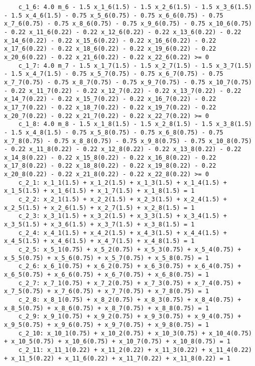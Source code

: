 \documentclass{article}[A4]
\begin{document}
\begin{lstlisting}
	c_1_6: 4.0 m_6 - 1.5 x_1_6(1.5) - 1.5 x_2_6(1.5) - 1.5 x_3_6(1.5) - 1.5 x_4_6(1.5) - 0.75 x_5_6(0.75) - 0.75 x_6_6(0.75) - 0.75 x_7_6(0.75) - 0.75 x_8_6(0.75) - 0.75 x_9_6(0.75) - 0.75 x_10_6(0.75) - 0.22 x_11_6(0.22) - 0.22 x_12_6(0.22) - 0.22 x_13_6(0.22) - 0.22 x_14_6(0.22) - 0.22 x_15_6(0.22) - 0.22 x_16_6(0.22) - 0.22 x_17_6(0.22) - 0.22 x_18_6(0.22) - 0.22 x_19_6(0.22) - 0.22 x_20_6(0.22) - 0.22 x_21_6(0.22) - 0.22 x_22_6(0.22) >= 0
	c_1_7: 4.0 m_7 - 1.5 x_1_7(1.5) - 1.5 x_2_7(1.5) - 1.5 x_3_7(1.5) - 1.5 x_4_7(1.5) - 0.75 x_5_7(0.75) - 0.75 x_6_7(0.75) - 0.75 x_7_7(0.75) - 0.75 x_8_7(0.75) - 0.75 x_9_7(0.75) - 0.75 x_10_7(0.75) - 0.22 x_11_7(0.22) - 0.22 x_12_7(0.22) - 0.22 x_13_7(0.22) - 0.22 x_14_7(0.22) - 0.22 x_15_7(0.22) - 0.22 x_16_7(0.22) - 0.22 x_17_7(0.22) - 0.22 x_18_7(0.22) - 0.22 x_19_7(0.22) - 0.22 x_20_7(0.22) - 0.22 x_21_7(0.22) - 0.22 x_22_7(0.22) >= 0
	c_1_8: 4.0 m_8 - 1.5 x_1_8(1.5) - 1.5 x_2_8(1.5) - 1.5 x_3_8(1.5) - 1.5 x_4_8(1.5) - 0.75 x_5_8(0.75) - 0.75 x_6_8(0.75) - 0.75 x_7_8(0.75) - 0.75 x_8_8(0.75) - 0.75 x_9_8(0.75) - 0.75 x_10_8(0.75) - 0.22 x_11_8(0.22) - 0.22 x_12_8(0.22) - 0.22 x_13_8(0.22) - 0.22 x_14_8(0.22) - 0.22 x_15_8(0.22) - 0.22 x_16_8(0.22) - 0.22 x_17_8(0.22) - 0.22 x_18_8(0.22) - 0.22 x_19_8(0.22) - 0.22 x_20_8(0.22) - 0.22 x_21_8(0.22) - 0.22 x_22_8(0.22) >= 0
	c_2_1: x_1_1(1.5) + x_1_2(1.5) + x_1_3(1.5) + x_1_4(1.5) + x_1_5(1.5) + x_1_6(1.5) + x_1_7(1.5) + x_1_8(1.5) = 1
	c_2_2: x_2_1(1.5) + x_2_2(1.5) + x_2_3(1.5) + x_2_4(1.5) + x_2_5(1.5) + x_2_6(1.5) + x_2_7(1.5) + x_2_8(1.5) = 1
	c_2_3: x_3_1(1.5) + x_3_2(1.5) + x_3_3(1.5) + x_3_4(1.5) + x_3_5(1.5) + x_3_6(1.5) + x_3_7(1.5) + x_3_8(1.5) = 1
	c_2_4: x_4_1(1.5) + x_4_2(1.5) + x_4_3(1.5) + x_4_4(1.5) + x_4_5(1.5) + x_4_6(1.5) + x_4_7(1.5) + x_4_8(1.5) = 1
	c_2_5: x_5_1(0.75) + x_5_2(0.75) + x_5_3(0.75) + x_5_4(0.75) + x_5_5(0.75) + x_5_6(0.75) + x_5_7(0.75) + x_5_8(0.75) = 1
	c_2_6: x_6_1(0.75) + x_6_2(0.75) + x_6_3(0.75) + x_6_4(0.75) + x_6_5(0.75) + x_6_6(0.75) + x_6_7(0.75) + x_6_8(0.75) = 1
	c_2_7: x_7_1(0.75) + x_7_2(0.75) + x_7_3(0.75) + x_7_4(0.75) + x_7_5(0.75) + x_7_6(0.75) + x_7_7(0.75) + x_7_8(0.75) = 1
	c_2_8: x_8_1(0.75) + x_8_2(0.75) + x_8_3(0.75) + x_8_4(0.75) + x_8_5(0.75) + x_8_6(0.75) + x_8_7(0.75) + x_8_8(0.75) = 1
	c_2_9: x_9_1(0.75) + x_9_2(0.75) + x_9_3(0.75) + x_9_4(0.75) + x_9_5(0.75) + x_9_6(0.75) + x_9_7(0.75) + x_9_8(0.75) = 1
	c_2_10: x_10_1(0.75) + x_10_2(0.75) + x_10_3(0.75) + x_10_4(0.75) + x_10_5(0.75) + x_10_6(0.75) + x_10_7(0.75) + x_10_8(0.75) = 1
	c_2_11: x_11_1(0.22) + x_11_2(0.22) + x_11_3(0.22) + x_11_4(0.22) + x_11_5(0.22) + x_11_6(0.22) + x_11_7(0.22) + x_11_8(0.22) = 1

\end{lstlisting}
\end{document}
